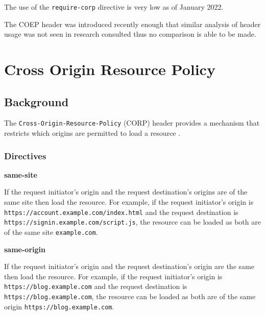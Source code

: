 \documentclass{mscreport}
\begin{document}
\vspace{0.3cm} \noindent
The use of the \texttt{require-corp} directive is very low as of January 2022.

\vspace{0.3cm} \noindent
The COEP header was introduced recently enough that similar analysis of header usage was not seen in research consulted thus no comparison is able to be made.

\clearpage
\newpage


\section{Cross Origin Resource Policy}
\label{section:corp}

\subsection{Background}

The \texttt{Cross-Origin-Resource-Policy} (CORP) header provides a mechanism that restricts which origins are permitted to load a resource \cite{Apple_undated-au}.

\subsubsection{Directives}
\textbf{same-site}

\vspace{0.3cm} \noindent
If the request initiator's origin and the request destination's origins are of the same site then load the resource. For example, if the request initiator's origin is \newline \texttt{https://account.example.com/index.html} and the request destination is \newline \texttt{https://signin.example.com/script.js}, the resource can be loaded as both are of the same site \texttt{example.com}.

\vspace{0.7cm} \noindent
\textbf{same-origin}

\vspace{0.3cm} \noindent
If the request initiator’s origin and the request destination's origin are the same then load the resource. For example, if the request initiator’s origin is \texttt{https://blog.example.com} and the request destination is \texttt{https://blog.example.com}, the resource can be loaded as both are of the same origin \texttt{https://blog.example.com}.
\end{document}
